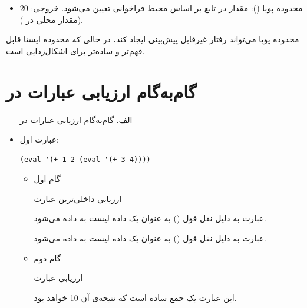 \documentclass[11pt, a4paper, oneside]{article}
\newcounter{itemadded}
\let\LaTeXStandardEnumerateBegin\enumerate
\let\LaTeXStandardEnumerateEnd\endenumerate
\renewenvironment{enumerate}{%
	\LaTeXStandardEnumerateBegin%
	\setcounter{itemadded}{0}
}{%
	\LaTeXStandardEnumerateEnd%
}%
\begin{document}
\begin{itemize}
\begin{itemize}
					\item {\large محدوده پویا ()}:
					{\normalsize مقدار  در تابع  بر اساس محیط فراخوانی  تعیین می‌شود. خروجی: 20 (مقدار محلی  در ).}
					
				\end{itemize}
				
				محدوده پویا می‌تواند رفتار غیرقابل پیش‌بینی ایجاد کند، در حالی که محدوده ایستا قابل فهم‌تر و ساده‌تر برای اشکال‌زدایی است.
				
			\section{گام‌به‌گام ارزیابی عبارات در }
			
				\begin{itemize}
					
					\item[الف.] گام‌به‌گام ارزیابی عبارات در 
					
						\begin{enumerate}
							
							\item عبارت اول:
							\begin{latin}
								\begin{lstlisting}[caption={\lr{Q2 A 1}}]
(eval '(+ 1 2 (eval '(+ 3 4))))

								\end{lstlisting}
							\end{latin}
							
							\begin{itemize}
								
								\item {\large گام اول} \par
								{\normalsize ارزیابی داخلی‌ترین عبارت } \par
								{\normalsize عبارت  به دلیل نقل قول () به عنوان یک داده لیست به  داده می‌شود.} \par
								{\normalsize عبارت  به دلیل نقل قول () به عنوان یک داده لیست به  داده می‌شود.} \par
								
								\item {\large گام دوم} \par
								{\normalsize ارزیابی عبارت } \par
								{\normalsize این عبارت یک جمع ساده است که نتیجه‌ی آن 10 خواهد بود.}
								

\end{itemize}
\end{enumerate}
\end{itemize}
\end{itemize}
\end{document}
